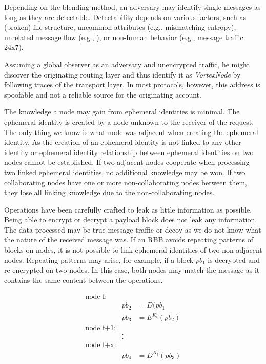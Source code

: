 \documentclass[acmsmall, screen, final]{acmart}
\begin{document}
	Depending on the blending method, an adversary may identify single messages as long as they are detectable. Detectability depends on various factors, such as (broken) file structure, uncommon attributes (e.g., mismatching entropy), unrelated message flow (e.g., \cite{oakland2013-parrot}), or non-human behavior (e.g., message traffic 24x7).
	
	Assuming a global observer as an adversary and unencrypted traffic, he might discover the originating routing layer and thus identify it as \emph{VortexNode} by following traces of the transport layer. In most protocols, however, this address is spoofable and not a reliable source for the originating account.
	
	The knowledge a node may gain from ephemeral identities is minimal. The ephemeral identity is created by a node unknown to the receiver of the request. The only thing we know is what node was adjacent when creating the ephemeral identity. As the creation of an ephemeral identity is not linked to any other identity or ephemeral identity relationship between ephemeral identities on two nodes cannot be established. If two adjacent nodes cooperate when processing two linked ephemeral identities, no additional knowledge may be won. If two collaborating nodes have one or more non-collaborating nodes between them, they lose all linking knowledge due to the non-collaborating nodes. 
	
	Operations have been carefully crafted to leak as little information as possible. Being able to encrypt or decrypt a payload block does not leak any information. The data processed may be true message traffic or decoy as we do not know what the nature of the received message was. If an RBB avoids repeating patterns of blocks on nodes, it is not possible to link ephemeral identities of two non-adjacent nodes. Repeating patterns may arise, for example, if a block $pb_1$ is decrypted and re-encrypted on two nodes. In this case, both nodes may match the message as it contains the same content between the operations.
	
	\begin{eqnarray*}
		\text{node f:}\\
		& pb_2 & = D(pb_1\\
		& pb_3 & = E^{K_t}(pb_2)\\
		\text{node f+1:}\\
		&.\\
		&.\\    
		\text{node f+x:}\\
		& pb_4 & = D^{K_t}(pb_3)\\
	\end{eqnarray*}
	
\end{document}
